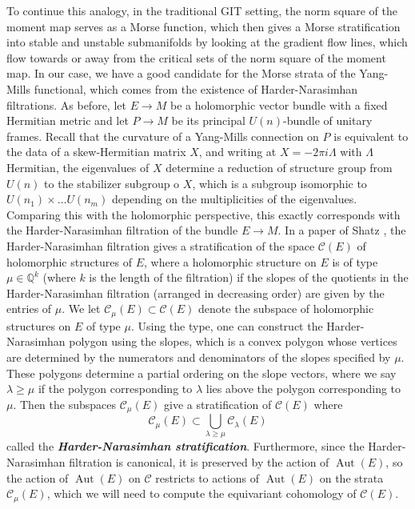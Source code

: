 \documentclass[psamsfonts, 12pt]{amsart}
\theoremstyle{definition}
\theoremstyle{remark}
\newcommand{\ib}[1]{\textbf{\textit{#1}}}
\newcommand{\Q}{\mathbb{Q}}
\DeclareMathOperator{\Aut}{Aut}
\begin{document}
To continue this analogy, in the traditional GIT setting, the norm square of the
moment map serves as a Morse function, which then gives a Morse stratification
into stable and unstable submanifolds by looking at the gradient flow lines, which
flow towards or away from the critical sets of the norm square of the moment map.
In our case, we have a good candidate for the Morse strata of the Yang-Mills
functional, which comes from the existence of Harder-Narasimhan filtrations.
As before, let $E \to M$ be a holomorphic vector bundle with a fixed Hermitian metric
and let $P \to M$ be its principal $U(n)$-bundle of unitary frames. Recall that
the curvature of a Yang-Mills connection on $P$ is equivalent to the data of a
skew-Hermitian matrix $X$, and writing at $X = -2\pi i \Lambda$ with $\Lambda$
Hermitian, the eigenvalues of $X$ determine a reduction of structure group
from $U(n)$ to the stabilizer subgroup o $X$, which is a subgroup isomorphic to
$U(n_1) \times \ldots U(n_m)$ depending on the multiplicities of the eigenvalues.
Comparing this with the holomorphic perspective, this exactly corresponds with the
Harder-Narasimhan filtration of the bundle $E \to M$. In a paper of Shatz
\cite{shatz1976}, the Harder-Narasimhan filtration gives a stratification of
the space $\mathscr{C}(E)$ of holomorphic structures of $E$, where a holomorphic
structure on $E$ is of type $\mu \in \Q^k$ (where $k$ is the length of the
filtration) if the slopes of the quotients in the Harder-Narasimhan filtration
(arranged in decreasing order) are given by the entries of $\mu$. We let
$\mathscr{C}_\mu(E) \subset \mathscr{C}(E)$ denote the subspace of holomorphic
structures on $E$ of type $\mu$. Using the type, one can construct the
Harder-Narasimhan polygon using the slopes, which is a convex polygon whose
vertices are determined by the numerators and denominators of the slopes
specified by $\mu$. These polygons determine a partial ordering on the slope
vectors, where we say $\lambda \geq \mu$ if the polygon corresponding to $\lambda$
lies above the polygon corresponding to $\mu$. Then the subspaces
$\mathscr{C}_\mu(E)$ give a stratification of $\mathscr{C}(E)$ where
\[
\mathscr{C}_\mu(E) \subset \bigcup_{\lambda \geq \mu} \mathscr{C}_\lambda(E)
\]
called the \ib{Harder-Narasimhan stratification}. Furthermore, since the
Harder-Narasimhan filtration is canonical, it is preserved by the
action of $\Aut(E)$, so the action of $\Aut(E)$ on $\mathscr{C}$ restricts
to actions of $\Aut(E)$ on the strata $\mathscr{C}_\mu(E)$, which we will
need to compute the equivariant cohomology of $\mathscr{C}(E)$.\\
\end{document}
